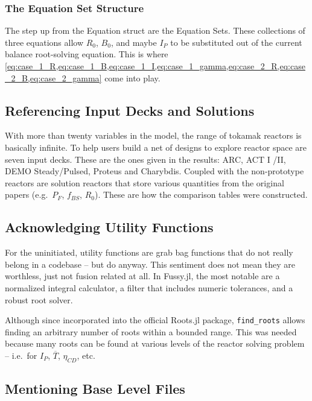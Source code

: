 \subsubsection{The Equation Set Structure}

The step up from the Equation struct are the Equation Sets. These collections of three equations allow $R_0$, $B_0$, and maybe $I_P$ to be substituted out of the current balance root-solving equation. This is where \cref{eq:case_1_R,eq:case_1_B,eq:case_1_I,eq:case_1_gamma,eq:case_2_R,eq:case_2_B,eq:case_2_gamma} come into play.

\subsection{Referencing Input Decks and Solutions}

With more than twenty  variables in the model, the range of tokamak reactors is basically infinite. To help users build a net of designs to explore reactor space are seven input decks. These are the ones given in the results: ARC, ACT I /II, DEMO Steady/Pulsed, Proteus and Charybdis. Coupled with the non-prototype reactors are solution reactors that store various quantities from the original papers (e.g.\ $P_F$, $f_{BS}$, $R_0$). These are how the comparison tables were constructed.

\subsection{Acknowledging Utility Functions}

For the uninitiated, utility functions are grab bag functions that do not really belong in a codebase -- but do anyway. This sentiment does not mean they are worthless, just not fusion related at all. In Fussy.jl, the most notable are a normalized integral calculator, a filter that includes numeric tolerances, and a robust root solver.

Although since incorporated into the official Roots.jl package, \texttt{find\_roots} allows finding an arbitrary number of roots within a bounded range. This was needed because many roots can be found at various levels of the reactor solving problem -- i.e.\ for $I_P$, $\overline T$, $\eta_{CD}$, etc.

\subsection{Mentioning Base Level Files}

